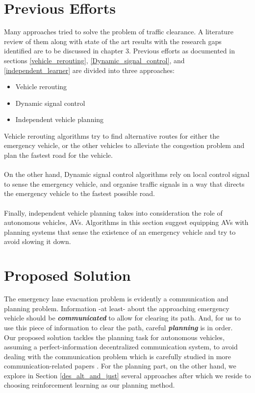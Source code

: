 \section{Previous Efforts}
\label{prev_eff}
Many approaches tried to solve the problem of traffic clearance. A literature review of them along with state of the art results with the research gaps identified are to be discussed in chapter 3. Previous efforts as documented in  sections \ref{vehicle_rerouting}, \ref{Dynamic_signal_control}, and \ref{independent_learner} are divided into three approaches:
\begin{itemize}
    \item Vehicle rerouting
    \item Dynamic signal control
    \item Independent vehicle planning
\end{itemize}
Vehicle rerouting algorithms try to find alternative routes for either the emergency vehicle, or the other vehicles to alleviate the congestion problem and plan the fastest road for the vehicle. 
\\ \\
On the other hand, Dynamic signal control algorithms rely on local control signal to sense the emergency vehicle, and organise traffic signals in a way that directs the emergency vehicle to the fastest possible road.
\\ \\
Finally, independent vehicle planning takes into consideration the role of autonomous vehicles, AVs. Algorithms in this section suggest equipping AVs with planning systems that sense the existence of an emergency vehicle and try to avoid slowing it down.


\section{Proposed Solution}
\label{prop_sol}
The emergency lane evacuation problem is evidently a communication and planning problem. Information -at least- about the approaching emergency vehicle should be \textit{\textbf{communicated}} to allow for clearing its path. And, for us to use this piece of information to clear the path, careful \textbf{\textit{planning}} is in order.\\

\noindent Our proposed solution tackles the planning task for autonomous vehicles, assuming a perfect-information decentralized communication system, to avoid dealing with the communication problem which is carefully studied in more communication-related papers  \cite{6550885}\cite{paper30}. For the planning part, on the other hand, we explore in Section \ref{des_alt_and_just} several approaches  after which we reside to choosing reinforcement learning as our planning method.\\

